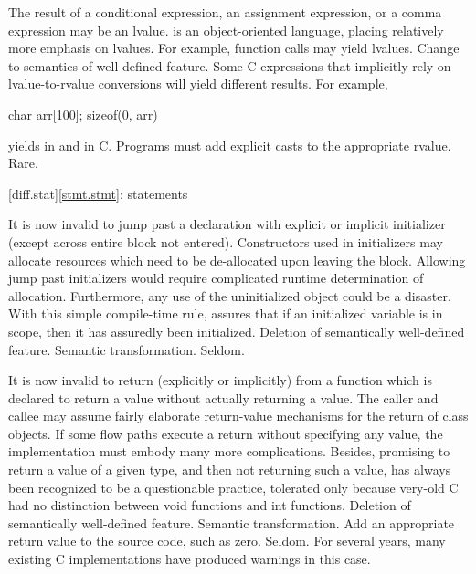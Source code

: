 %
%
%
\change
The result of a conditional expression, an assignment expression, or a comma expression may be an lvalue.
\rationale
\Cpp{} is an object-oriented language, placing relatively
more emphasis on lvalues.  For example, function calls may
yield lvalues.
\effect
Change to semantics of well-defined feature.  Some C
expressions that implicitly rely on lvalue-to-rvalue
conversions will yield different results.  For example,
\begin{codeblock}
char arr[100];
sizeof(0, arr)
\end{codeblock}
yields
in \Cpp{} and
in C.
\difficulty
Programs must add explicit casts to the appropriate rvalue.
\howwide
Rare.

[diff.stat]{\ref{stmt.stmt}: statements}

\change
It is now invalid to jump past a declaration with explicit or implicit initializer (except across entire block not entered).
\rationale
Constructors used in initializers may allocate
resources which need to be de-allocated upon leaving the
block.
Allowing jump past initializers would require
complicated runtime determination of allocation.
Furthermore, any use of the uninitialized object could be a
disaster.
With this simple compile-time rule, \Cpp{} assures that
if an initialized variable is in scope, then it has assuredly been
initialized.
\effect
Deletion of semantically well-defined feature.
\difficulty
Semantic transformation.
\howwide
Seldom.

\change
It is now invalid to return (explicitly or implicitly) from a function which is
declared to return a value without actually returning a value.
\rationale
The caller and callee may assume fairly elaborate
return-value mechanisms for the return of class objects.
If
some flow paths execute a return without specifying any value,
the implementation must embody many more complications.
Besides,
promising to return a value of a given type, and then not returning
such a value, has always been recognized to be a questionable
practice, tolerated only because very-old C had no distinction between
void  functions and  int  functions.
\effect
Deletion of semantically well-defined feature.
\difficulty
Semantic transformation.
Add an appropriate return value to the source code, such as zero.
\howwide
Seldom.
For several years, many existing C implementations have produced warnings in
this case.

